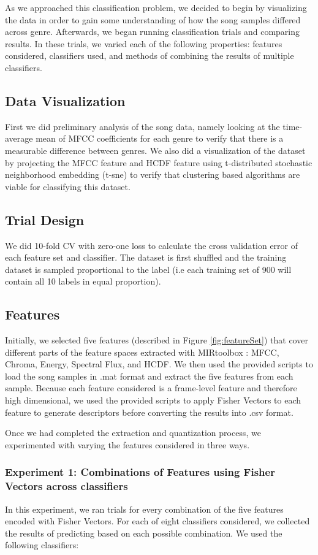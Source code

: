 As we approached this classification problem, we decided to begin by visualizing the data in order to gain some understanding of how the song samples differed across genre. Afterwards, we began running classification trials and comparing results. In these trials, we varied each of the following properties: features considered, classifiers used, and methods of combining the results of multiple classifiers.

\subsection{Data Visualization}
First we did preliminary analysis of the song data, namely looking at the time-average mean of MFCC coefficients for each genre to verify that there is a measurable difference between genres. We also did a visualization of the dataset by projecting the MFCC feature and HCDF feature using t-distributed stochastic neighborhood embedding (t-sne) \cite{tsne} to verify that clustering based algorithms are viable for classifying this dataset.

\subsection{Trial Design}
We did 10-fold CV with zero-one loss to calculate the cross validation error of each feature set and classifier. The dataset is first shuffled and the training dataset is sampled proportional to the label (i.e each training set of 900 will contain all 10 labels in equal proportion).

\subsection{Features}
Initially, we selected five features (described in Figure \ref{fig:featureSet}) that cover different parts of the feature spaces extracted with MIRtoolbox \cite{MIR}: MFCC, Chroma, Energy, Spectral Flux, and HCDF. We then used the provided scripts to load the song samples in .mat format and extract the five features from each sample. Because each feature considered is a frame-level feature and therefore high dimensional, we used the provided scripts to apply Fisher Vectors to each feature to generate descriptors before converting the results into .csv format. 

Once we had completed the extraction and quantization process, we experimented with varying the features considered in three ways.

\subsubsection{Experiment 1: Combinations of Features using Fisher Vectors across classifiers}
In this experiment, we ran trials for every combination of the five features encoded with Fisher Vectors. For each of eight classifiers considered, we collected the results of predicting based on each possible combination. We used the following classifiers:

